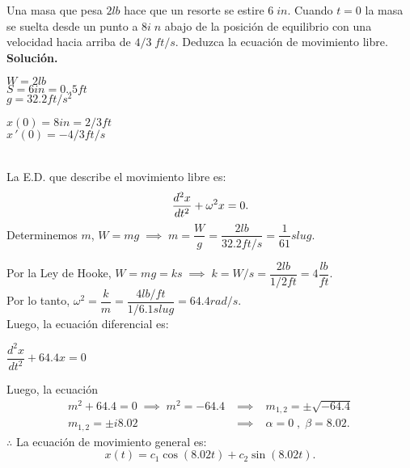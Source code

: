 \documentclass{beamer}
\begin{document}
\begin{frame}[t]
	\begin{example}
		Una masa que pesa \(2lb\) hace que un resorte se estire \(6\;in\).
		Cuando \(t=0\)  la masa se suelta desde un punto a \(8i\;n\) abajo de la posición de equilibrio con una velocidad hacia arriba de \(4/3\;ft/s\).
		Deduzca la ecuación de movimiento libre. \\[2mm]
		\textbf{Solución.} \\[4mm]
		\begin{minipage}{0.5\linewidth}
			\(W=2lb\) \\
			\(S = 6in= 0..5ft\) \\
			\(g = 32.2ft/s^2\)
		\end{minipage}
		\begin{minipage}{0.4\linewidth}
			\(x(0) = 8in = 2/3ft\) \\
			\(x\,'(0) = -4/3ft/s\)
		\end{minipage} \\[2mm]
		La E.D. que describe el movimiento libre es:
		\[
			\dfrac{d^2x}{dt^2} + \omega ^2x = 0. \vspace{-4mm}
		\]
		Determinemos \(m\), \(W = mg \;\implies\; m = \dfrac{W}{g} = \dfrac{2lb}{32.2ft/s} = \dfrac{1}{61} slug\).
	\end{example}
\end{frame}

\begin{frame}[t]
	\begin{exampleblock}{}
		Por la Ley de Hooke, \(W = mg = k s \;\implies\; k = W/s = \dfrac{2lb}{1/2ft} = 4 \dfrac{lb}{ft}\). \\[2mm]
		Por lo tanto, \(\omega ^2= \dfrac{k}{m} = \dfrac{4lb/ft}{1/6.1slug} = 64.4 rad/s\). \\[2mm]
		Luego, la ecuación diferencial es:
		\begin{center}
			\color{red} \underline{\color{black} \(\dfrac{d^2x}{dt^2} + 64.4x = 0\)}
		\end{center}
		Luego, la ecuación
		\[
			\begin{array}{rcl}
				m^2+64.4 = 0 \;\implies\; m^2=-64.4 & \;\implies\; & m_{1,2} = \pm \sqrt{-64.4} \\[2mm]
				m_{1,2} = \pm i 8.02 & \;\implies\; & \alpha =0 \;,\; \beta =8.02.
			\end{array}
		\]
		\(\therefore\) \hspace{5mm} La ecuación de movimiento general es: \vspace{-4mm}
		\[
			x(t) = c_1 \cos (8.02t) + c_2 \sin (8.02t).
		\]
	\end{exampleblock}
\end{frame}
\end{document}
